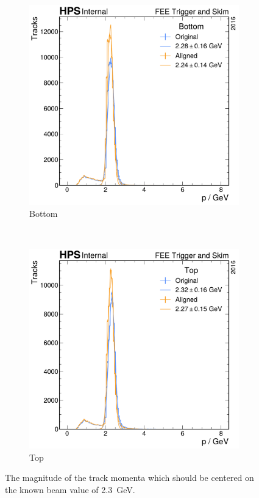 \begin{figure}
  \centering
  \begin{subfigure}{0.48\textwidth}
    \includegraphics[width=\textwidth]{figures/hps/alignment/p_bottom.pdf}
    \caption{Bottom}
  \end{subfigure}
  ~
  \begin{subfigure}{0.48\textwidth}
    \includegraphics[width=\textwidth]{figures/hps/alignment/p_top.pdf}
    \caption{Top}
  \end{subfigure}
  \caption{The magnitude of the track momenta which should be centered on
  the known beam value of \qty{2.3}{\giga\electronvolt}.}
  \label{fig:example-align-p}
\end{figure}


